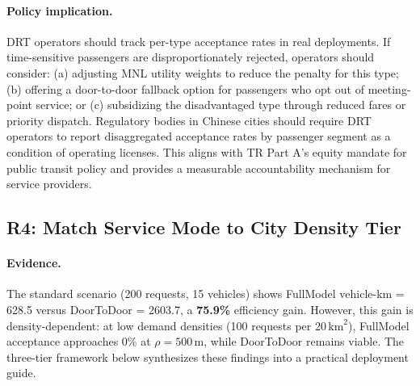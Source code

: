 \paragraph{Policy implication.}
DRT operators should track per-type acceptance rates in real deployments.
If time-sensitive passengers are disproportionately rejected, operators
should consider: (a) adjusting MNL utility weights to reduce the penalty
for this type; (b) offering a door-to-door fallback option for passengers
who opt out of meeting-point service; or (c) subsidizing the disadvantaged
type through reduced fares or priority dispatch. Regulatory bodies in
Chinese cities should require DRT operators to report disaggregated
acceptance rates by passenger segment as a condition of operating licenses.
This aligns with TR Part A's equity mandate for public transit policy and
provides a measurable accountability mechanism for service providers.

\subsection{R4: Match Service Mode to City Density Tier}

\paragraph{Evidence.}
The standard scenario (200 requests, 15 vehicles) shows FullModel
vehicle-km = 628.5 versus DoorToDoor = 2603.7, a \textbf{75.9\%} efficiency
gain. However, this gain is density-dependent: at low demand densities
(100 requests per $20\,\text{km}^2$), FullModel acceptance approaches 0\%
at $\rho = 500$\,m, while DoorToDoor remains viable. The three-tier
framework below synthesizes these findings into a practical deployment guide.

